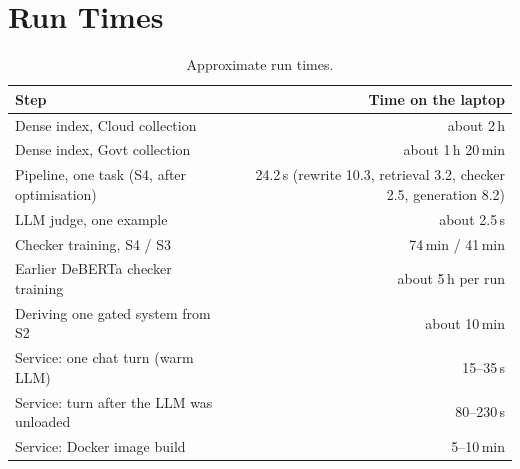 \documentclass[11pt,a4paper]{report}
\newcommand{\sys}[1]{\textsf{#1}}
\begin{document}
\chapter{Run Times}
\begin{table}[H]
\centering\small
\begin{tabular}{@{}lr@{}}
\toprule
Step & Time on the laptop \\
\midrule
Dense index, Cloud collection & about 2\,h \\
Dense index, Govt collection & about 1\,h 20\,min \\
Pipeline, one task (\sys{S4}, after optimisation) & 24.2\,s (rewrite 10.3, retrieval 3.2, checker 2.5, generation 8.2) \\
LLM judge, one example & about 2.5\,s \\
Checker training, \sys{S4} / \sys{S3} & 74\,min / 41\,min \\
Earlier DeBERTa checker training & about 5\,h per run \\
Deriving one gated system from \sys{S2} & about 10\,min \\
Service: one chat turn (warm LLM) & 15--35\,s \\
Service: turn after the LLM was unloaded & 80--230\,s \\
Service: Docker image build & 5--10\,min \\
\bottomrule
\end{tabular}
\caption{Approximate run times.}
\end{table}
\end{document}

